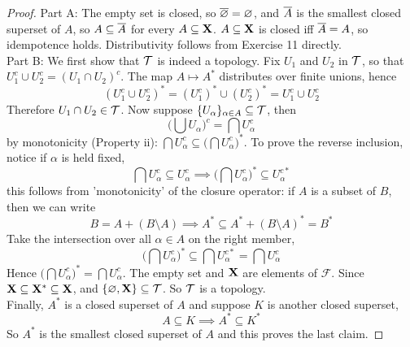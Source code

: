 \documentclass[../../main.tex]{subfiles}
\begin{document}
\begin{proof}
    Part A: The empty set is closed, so $\overline{\varnothing}=\varnothing$, and $\overline{A}$ is the smallest closed superset of $A$, so $A\subseteq\overline{A}$ for every $A\subseteq{\mathbf{X}}$. $A\subseteq{\mathbf{X}}$ is closed iff $\overline{A} = A$, so idempotence holds. Distributivity follows from Exercise 11 directly.\\

    Part B: We first show that $\mathcal{T}$ is indeed a topology. Fix $U_1$ and $U_2$ in $\mathcal{T}$, so that $U_1^c\cup U_2^c = (U_1\cap U_2)^c$. The map $A\mapsto A^*$ distributes over finite unions, hence 
    \[
        (U_1^c \cup U_2^c)^* = (U_1^c)^* \cup (U_2^c)^* = U_1^c\cup U_2^c
    \]
    Therefore $U_1\cap U_2\in \mathcal{T}$. Now suppose $\{U_\alpha\}_{\alpha\in A}\subseteq\mathcal{T}$, then
    \[
        \biggl( \bigcup U_\alpha\biggr)^c = \bigcap U_\alpha^c
    \]
    by monotonicity (Property ii): $\bigcap U_\alpha^c\subseteq\biggl(\bigcap U_\alpha^c\biggr)^*$. To prove the reverse inclusion, notice if $\alpha$ is held fixed,
    \[
        \bigcap U_\alpha^c\subseteq U_\alpha^c\implies \biggl(\bigcap U_\alpha^c\biggr)^*\subseteq U_\alpha^{c*}
    \]
    this follows from 'monotonicity' of the closure operator: if $A$ is a subset of $B$, then we can write 
    \[
        B = A + (B\setminus A)\implies A^* \subseteq A^* + (B\setminus A)^* = B^*
    \]
    Take the intersection over all $\alpha\in A$ on the right member,
    \[
        \biggl(\bigcap U_\alpha^c\biggr)^*\subseteq \bigcap U_\alpha^{c*} = \bigcap U_\alpha^c
    \]
    Hence $\biggl(\bigcap U_\alpha^c \biggr)^* = \bigcap U_\alpha^c $. The empty set and ${\mathbf{X}}$ are elements of $\mathcal{F}$. Since ${\mathbf{X}}\subseteq {\mathbf{X}}^*\subseteq {\mathbf{X}}$, and $\{\varnothing,{\mathbf{X}}\}\subseteq\mathcal{T}$. So $\mathcal{T}$ is a topology.\\

    Finally, $A^*$ is a closed superset of $A$ and suppose $K$ is another closed superset,
    \[
        A \subseteq K\implies A^*\subseteq K^*
    \]
    So $A^*$ is the smallest closed superset of $A$ and this proves the last claim.
\end{proof}
\newpage
\end{document}
